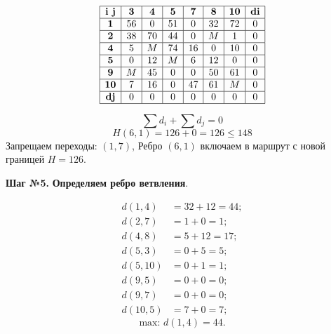 \documentclass[17pt]{extarticle}
\begin{document}
\[
    \begin{array}{|c|c|c|c|c|c|c|c|}
        \hline
        \textbf{i j} & \textbf{3} & \textbf{4} & \textbf{5} & \textbf{7} & \textbf{8} & \textbf{10} & \textbf{di} \\
        \hline
        \textbf{1}   & 56         & 0          & 51         & 0          & 32         & 72          & 0           \\
        \hline
        \textbf{2}   & 38         & 70         & 44         & 0          & M          & 1           & 0           \\
        \hline
        \textbf{4}   & 5          & M          & 74         & 16         & 0          & 10          & 0           \\
        \hline
        \textbf{5}   & 0          & 12         & M          & 6          & 12         & 0           & 0           \\
        \hline
        \textbf{9}   & M          & 45         & 0          & 0          & 50         & 61          & 0           \\
        \hline
        \textbf{10}  & 7          & 16         & 0          & 47         & 61         & M           & 0           \\
        \hline
        \textbf{dj}  & 0          & 0          & 0          & 0          & 0          & 0           & 0           \\
        \hline
    \end{array}
\]

\[ \sum d_i + \sum d_j = 0 \]
\[ H(6,1) = 126 + 0 = 126 \leq 148 \]
Запрещаем переходы: \((1,7)\),
Ребро \((6,1)\) включаем в маршрут с новой границей \( H = 126 \).

\textbf{Шаг №5.}
\textbf{Определяем ребро ветвления}.

\[
    \begin{aligned}
        d(1,4)  & = 32 + 12 = 44; \\
        d(2,7)  & = 1 + 0 = 1;    \\
        d(4,8)  & = 5 + 12 = 17;  \\
        d(5,3)  & = 0 + 5 = 5;    \\
        d(5,10) & = 0 + 1 = 1;    \\
        d(9,5)  & = 0 + 0 = 0;    \\
        d(9,7)  & = 0 + 0 = 0;    \\
        d(10,5) & = 7 + 0 = 7;
    \end{aligned}
\]
\[ \text{max: } d(1,4) = 44. \]
\end{document}
